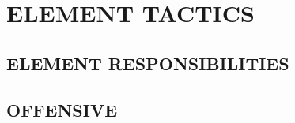 \section{ELEMENT TACTICS}

\subsection{ELEMENT RESPONSIBILITIES}

\subsection{OFFENSIVE}

\begin{tcoloritemize}
\end{tcoloritemize}

